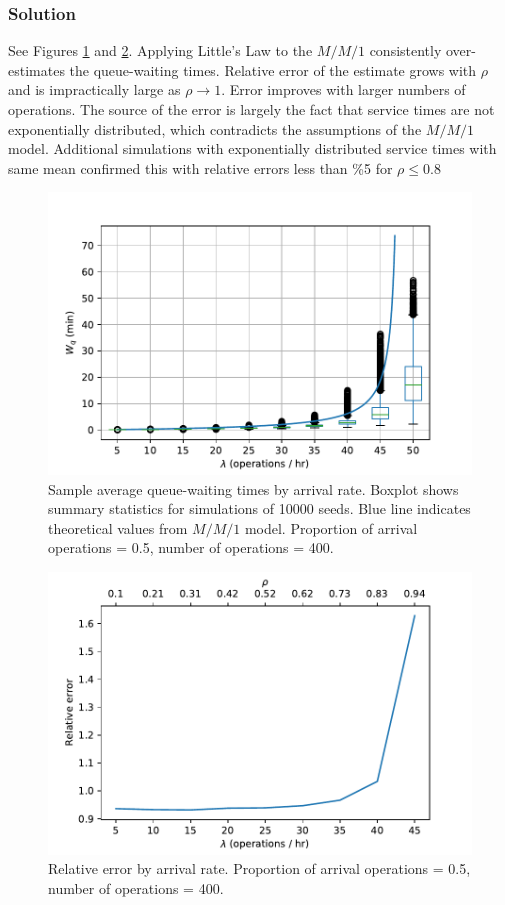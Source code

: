 \documentclass[letterpaper]{amsart}
\begin{document}
\subsubsection*{Solution}
See Figures \ref{fig:5c} and \ref{fig:5cb}. Applying Little's Law to the $M/M/1$
consistently over-estimates the queue-waiting times. Relative error of the
estimate grows with $\rho$ and is impractically large as
$\rho\rightarrow 1$.
Error improves with larger numbers of operations.
The source of the error is largely the fact that service times are not exponentially
distributed, which contradicts the assumptions of the $M/M/1$ model.
Additional simulations with exponentially distributed service times with same mean
confirmed this with relative errors less than \%5 for $\rho\leq 0.8$
\begin{figure}
  \centering
  \caption{Sample average queue-waiting times by arrival rate. Boxplot shows
    summary statistics for simulations of 10000 seeds. Blue line indicates
    theoretical values from $M/M/1$ model.
    Proportion of arrival operations = 0.5, number of operations = 400.}
  \label{fig:5c}
  \includegraphics[width=\textwidth]{W_q1}
\end{figure}
\begin{figure}
  \centering
  \caption{Relative error by arrival rate.
    Proportion of arrival operations = 0.5, number of operations = 400.}
  \label{fig:5cb}
  \includegraphics[width=\textwidth]{er1}
\end{figure}
\end{document}
